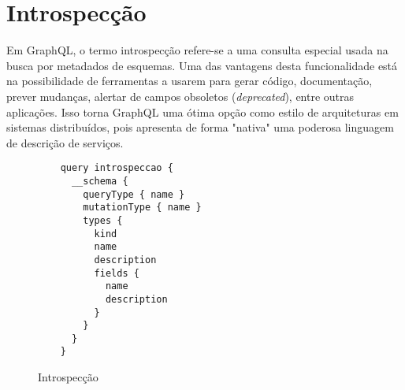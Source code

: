\section[Introspecção]{Introspecção}

Em GraphQL, o termo introspecção refere-se a uma consulta especial usada na busca por metadados de esquemas. Uma das vantagens desta funcionalidade está na possibilidade de ferramentas a usarem para gerar código, documentação, prever mudanças, alertar de campos obsoletos (\textit{deprecated}), entre outras aplicações. Isso torna GraphQL uma ótima opção como estilo de arquiteturas em sistemas distribuídos, pois apresenta de forma "nativa" uma poderosa linguagem de descrição de serviços.

\begin{figure}[H]
  \centering
  \begin{verbatim}
    query introspeccao {
      __schema {
        queryType { name }
        mutationType { name }
        types {
          kind
          name
          description
          fields {
            name
            description
          }
        }
      }
    }
  \end{verbatim}
  \caption{Introspecção}
\end{figure}
